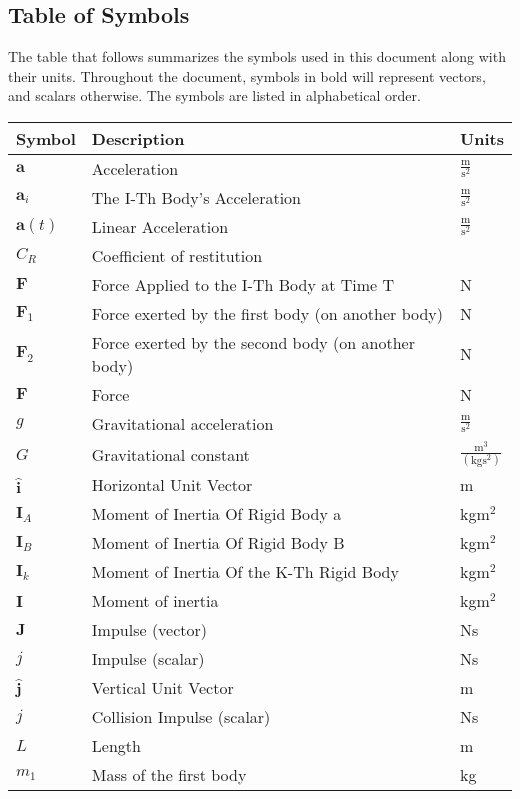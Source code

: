 \documentclass[12pt]{article}
\begin{document}
\subsection{Table of Symbols}
\label{Sec:ToS}
The table that follows summarizes the symbols used in this document along with their units. Throughout the document, symbols in bold will represent vectors, and scalars otherwise. The symbols are listed in alphabetical order.
\begin{longtabu}{l X[l] l}
\toprule
Symbol & Description & Units
\\
\midrule
$\mathbf{a}$ & Acceleration & $\frac{\text{m}}{\text{s}^{2}}$
\\
${\mathbf{a}_{i}}$ & The I-Th Body's Acceleration & $\frac{\text{m}}{\text{s}^{2}}$
\\
$\mathbf{a}(t)$ & Linear Acceleration & $\frac{\text{m}}{\text{s}^{2}}$
\\
${C_{R}}$ & Coefficient of restitution & 
\\
$\mathbf{F}$ & Force Applied to the I-Th Body at Time T & N
\\
${\mathbf{F}_{1}}$ & Force exerted by the first body (on another body) & N
\\
${\mathbf{F}_{2}}$ & Force exerted by the second body (on another body) & N
\\
$\mathbf{F}$ & Force & N
\\
$g$ & Gravitational acceleration & $\frac{\text{m}}{\text{s}^{2}}$
\\
$G$ & Gravitational constant & $\frac{\text{m}^{3}}{(\text{kg}\text{s}^{2})}$
\\
$\mathbf{\hat{i}}$ & Horizontal Unit Vector & m
\\
${\mathbf{I}_{A}}$ & Moment of Inertia Of Rigid Body a & kg$\text{m}^{2}$
\\
${\mathbf{I}_{B}}$ & Moment of Inertia Of Rigid Body B & kg$\text{m}^{2}$
\\
${\mathbf{I}_{k}}$ & Moment of Inertia Of the K-Th Rigid Body & kg$\text{m}^{2}$
\\
$\mathbf{I}$ & Moment of inertia & kg$\text{m}^{2}$
\\
$\mathbf{J}$ & Impulse (vector) & Ns
\\
$j$ & Impulse (scalar) & Ns
\\
$\mathbf{\hat{j}}$ & Vertical Unit Vector & m
\\
$j$ & Collision Impulse (scalar) & Ns
\\
$L$ & Length & m
\\
${m_{1}}$ & Mass of the first body & kg

\end{longtabu}
\end{document}
